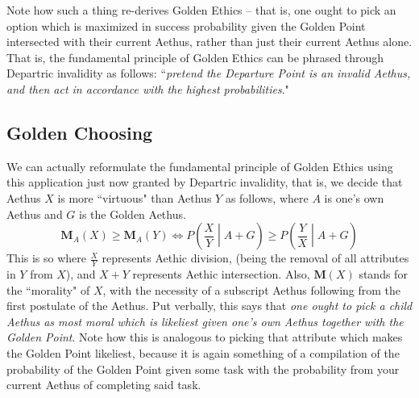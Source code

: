 Note how such a thing re-derives Golden Ethics -- that is, one ought to pick an option which is maximized in success probability given the Golden Point intersected with their current Aethus, rather than just their current Aethus alone. That is, the fundamental principle of Golden Ethics can be phrased through Departric invalidity as follows: ``\textit{pretend the Departure Point is an invalid Aethus, and then act in accordance with the highest probabilities}."

\subsection{Golden Choosing}

We can actually reformulate the fundamental principle of Golden Ethics using this application just now granted by Departric invalidity, that is, we decide that Aethus $X$ is more ``virtuous" than Aethus $Y$ as follows, where $A$ is one's own Aethus and $G$ is the Golden Aethus.
\begin{equation}
    \mathbf{M}_A \! \left( X \right) \geq \mathbf{M}_A \! \left( Y \right) \Leftrightarrow P \! \left( \frac{X}{Y} \middle| A + G \right) \geq P \! \left( \frac{Y}{X} \middle| A + G \right)
\end{equation}
This is so where $\frac{X}{Y}$ represents Aethic division, (being the removal of all attributes in $Y$ from $X$), and $X + Y$ represents Aethic intersection. Also, $\mathbf{M} \! \left( X \right)$ stands for the ``morality" of $X$, with the necessity of a subscript Aethus following from the first postulate of the Aethus. Put verbally, this says that \textit{one ought to pick a child Aethus as most moral which is likeliest given one's own Aethus together with the Golden Point}. Note how this is analogous to picking that attribute which makes the Golden Point likeliest, because it is again something of a compilation of the probability of the Golden Point given some task with the probability from your current Aethus of completing said task. 
